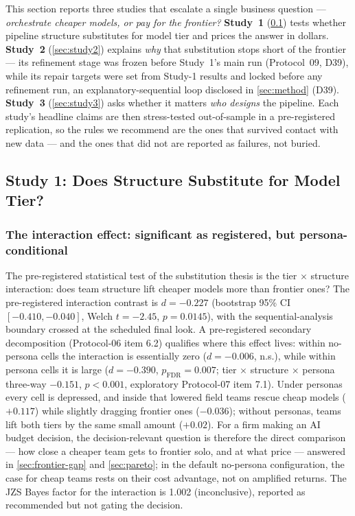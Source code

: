 \documentclass[12pt,a4paper]{article}
\begin{document}
This section reports three studies that escalate a single business question ---
\emph{orchestrate cheaper models, or pay for the frontier?} \textbf{Study~1}
(\cref{sec:study1}) tests whether pipeline structure substitutes for model tier
and prices the answer in dollars. \textbf{Study~2} (\cref{sec:study2}) explains
\emph{why} that substitution stops short of the frontier --- its refinement
stage was frozen before Study~1's main run (Protocol~09, D39), while its
repair targets were set from Study-1 results and locked before any refinement
run, an explanatory-sequential loop disclosed in \cref{sec:method} (D39).
\textbf{Study~3}
(\cref{sec:study3}) asks whether it matters \emph{who designs} the pipeline.
Each study's headline claims are then stress-tested out-of-sample in a
pre-registered replication, so the rules we recommend are the ones that survived
contact with new data --- and the ones that did not are reported as failures,
not buried.

\subsection{Study 1: Does Structure Substitute for Model Tier?}\label{sec:study1}

\subsubsection{The interaction effect: significant as registered, but
persona-conditional}\label{sec:interaction}

The pre-registered statistical test of the substitution thesis is the tier
$\times$ structure interaction: does team structure lift cheaper models more
than frontier ones? The pre-registered interaction contrast is $d = -0.227$
(bootstrap 95\% CI $[-0.410, -0.040]$, Welch $t = -2.45$, $p = 0.0145$), with
the sequential-analysis boundary crossed at the scheduled final look. A
pre-registered secondary decomposition (Protocol-06 item 6.2) qualifies where
this effect lives: within no-persona cells the interaction is essentially zero
($d = -0.006$, n.s.), while within persona cells it is large
($d = -0.390$, $p_{\mathrm{FDR}} = 0.007$; tier $\times$ structure $\times$
persona three-way $-0.151$, $p < 0.001$, exploratory Protocol-07 item 7.1).
Under personas every cell is depressed, and inside that lowered field teams
rescue cheap models ($+0.117$) while slightly dragging frontier ones
($-0.036$); without personas, teams lift both tiers by the same small amount
($+0.02$). For a
firm making an AI budget decision, the decision-relevant question is therefore
the direct comparison --- how close a cheaper team gets to frontier solo, and
at what price --- answered in \cref{sec:frontier-gap} and \cref{sec:pareto};
in the default no-persona configuration, the case for
cheap teams rests on their cost advantage, not on
amplified returns. The JZS Bayes factor for the interaction is
1.002 (inconclusive), reported as recommended but not gating the decision.
\end{document}
